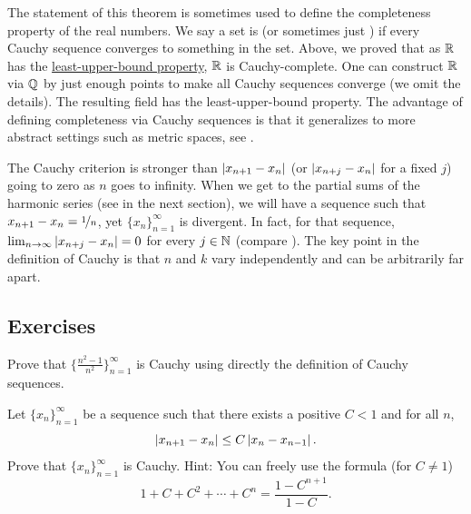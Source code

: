 \begin{remark}
The statement of this theorem is sometimes used to define the
completeness property of the real numbers.  We say a set is
\emph{} (or sometimes just \emph{})
if every Cauchy sequence converges to something in the set.
Above, we proved that
as ${\mathbb{R}}$ has the \hyperref[defn:lub]{least-upper-bound property}, ${\mathbb{R}}$ is 
Cauchy-complete.
One can construct ${\mathbb{R}}$ via
 ${\mathbb{Q}}$ by  just enough points to make all
Cauchy sequences converge (we omit the details).
The resulting field has the
least-upper-bound property.
The advantage of defining completeness via Cauchy
sequences is that it generalizes to
more abstract settings such as metric spaces, see .
\end{remark}

The Cauchy criterion is stronger than 
$\left\lvert {x_{n+1}-x_n} \right\rvert$ (or $\left\lvert {x_{n+j}-x_n} \right\rvert$ for a fixed $j$) going to zero as
$n$ goes to
infinity.  When we get to the partial sums of the harmonic series
(see  in the next section), we will have
a sequence such that $x_{n+1}-x_n = \nicefrac{1}{n}$,
yet $\{ x_n \}_{n=1}^\infty$ is divergent.
In fact, for that sequence,
$\lim_{n\to\infty} \left\lvert {x_{n+j}-x_n} \right\rvert = 0$ for
every $j \in {\mathbb{N}}$ (compare ).
The key point in the definition of Cauchy is that $n$ and $k$
vary independently and can be arbitrarily far apart.

\subsection{Exercises}

\begin{exercise}
Prove that $\{ \frac{n^2-1}{n^2} \}_{n=1}^\infty$ is Cauchy using directly the definition
of Cauchy sequences.
\end{exercise}

\begin{exercise}
Let $\{ x_n \}_{n=1}^\infty$ be a sequence such that
there exists a positive $C < 1$ and for all $n$,
\begin{equation*}
\left\lvert {x_{n+1} - x_n} \right\rvert \leq C \left\lvert {x_{n}-x_{n-1}} \right\rvert .
\end{equation*}
Prove that $\{ x_n \}_{n=1}^\infty$ is Cauchy.
Hint:  You can freely use the formula (for $C \not= 1$)
\begin{equation*}
1+ C+ C^2 + \cdots + C^n = \frac{1-C^{n+1}}{1-C}.
\end{equation*}
\end{exercise}

